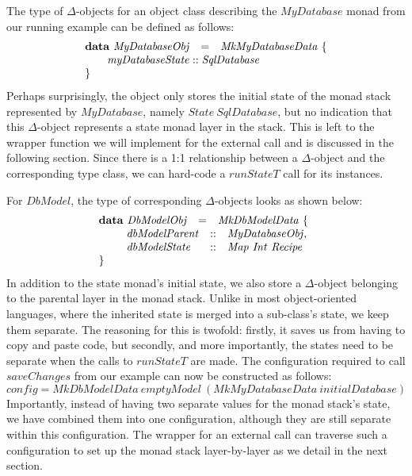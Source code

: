 The type of $\Delta$-objects for an object class describing the $\mathit{MyDatabase}$ monad from our running example can be defined as follows:
\begin{displaymath}
\begin{array}{lcl}
\mathbf{data}~\mathit{MyDatabaseObj} & = & \mathit{MkMyDatabaseData}~\{ \\
\multicolumn{3}{l}{\qquad \mathit{myDatabaseState} :: \mathit{SqlDatabase} }  \\
\} && 
\end{array}
\end{displaymath}
Perhaps surprisingly, the object only stores the initial state of the monad stack represented by $\mathit{MyDatabase}$, namely $\mathit{State}~\mathit{SqlDatabase}$, but no indication that this $\Delta$-object represents a state monad layer in the stack. This is left to the wrapper function we will implement for the external call and is discussed in the following section. Since there is a 1:1 relationship between a $\Delta$-object and the corresponding type class, we can hard-code a $\mathit{runStateT}$ call for its instances.

For $\mathit{DbModel}$, the type of corresponding $\Delta$-objects looks as shown below:
\begin{displaymath}
\begin{array}{lcl}
\mathbf{data}~\mathit{DbModelObj} & = & \mathit{MkDbModelData}~\{ \\
\multicolumn{3}{l}{\qquad \begin{array}{lcl}
\mathit{dbModelParent} & :: & \mathit{MyDatabaseObj}, \\
\mathit{dbModelState} & :: & \mathit{Map}~\mathit{Int}~\mathit{Recipe}
\end{array}  }  \\
\} && 
\end{array}
\end{displaymath}
In addition to the state monad's initial state, we also store a $\Delta$-object belonging to the parental layer in the monad stack. Unlike in most object-oriented languages, where the inherited state is merged into a sub-class's state, we keep them separate. The reasoning for this is twofold: firstly, it saves us from having to copy and paste code, but secondly, and more importantly, the states need to be separate when the calls to $\mathit{runStateT}$ are made. The configuration required to call $\mathit{saveChanges}$ from our example can now be constructed as follows:
\begin{displaymath}
\mathit{config} = \mathit{MkDbModelData}~\mathit{emptyModel}~(\mathit{MkMyDatabaseData}~\mathit{initialDatabase})
\end{displaymath}
Importantly, instead of having two separate values for the monad stack's state, we have combined them into one configuration, although they are still separate within this configuration. The wrapper for an external call can traverse such a configuration to set up the monad stack layer-by-layer as we detail in the next section.

